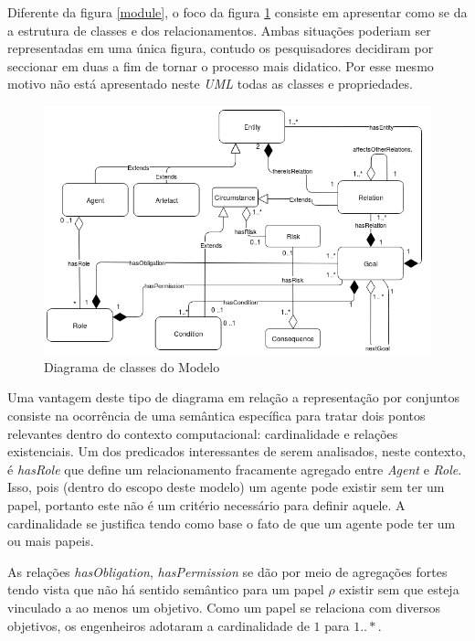 Diferente da figura \ref{module}, o foco da figura \ref{classdiagrama} consiste em apresentar como se da a estrutura de classes e dos relacionamentos. 
Ambas situações poderiam ser representadas em uma única figura, contudo os pesquisadores decidiram por seccionar em duas a fim de tornar o processo 
mais didatico. Por esse mesmo motivo não está apresentado neste \textit{UML} todas as classes e propriedades.  

\begin{figure}[H]
  \centering
  \includegraphics[width=1\linewidth]{figure/Class.png} 
  \caption{Diagrama de classes do Modelo }
  \label{classdiagrama}
\end{figure}

Uma vantagem deste tipo de diagrama em relação a representação por conjuntos consiste na ocorrência de uma semântica específica para tratar dois pontos
relevantes dentro do contexto computacional: cardinalidade e relações existenciais. Um dos predicados interessantes de serem analisados, neste contexto, 
é \textit{hasRole} que define um relacionamento fracamente agregado entre \textit{Agent} e \textit{Role}. Isso, pois (dentro do escopo deste modelo) um 
agente pode existir sem ter um papel, portanto este não é um critério necessário para definir aquele. A cardinalidade se justifica tendo como base o fato 
de que um agente pode ter um ou mais papeis. 

As relações \textit{hasObligation}, \textit{hasPermission} se dão por meio de agregações fortes tendo vista que não há sentido semântico para um papel 
$\rho$ existir sem que esteja vinculado a ao menos um objetivo. Como um papel se relaciona com diversos objetivos, os engenheiros adotaram a cardinalidade 
de $1$ para $1 .. *$.

